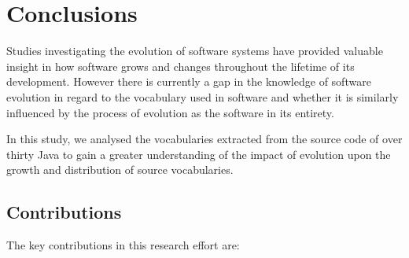 
\chapter{Conclusions}
\label{cha:conclusions}

Studies investigating the evolution of software systems have provided valuable insight in how software grows and changes throughout the lifetime of its development. However there is currently a gap in the knowledge of software evolution in regard to the vocabulary used in software and whether it is similarly influenced by the process of evolution as the software in its entirety.

In this study, we analysed the vocabularies extracted from the source code of over thirty Java {\OSYS} to gain a greater understanding of the impact of evolution upon the growth and distribution of source vocabularies.

\section{Contributions} %
\label{sec:contributions}

The key contributions in this research effort are:

